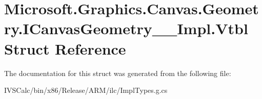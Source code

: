 \hypertarget{struct_microsoft_1_1_graphics_1_1_canvas_1_1_geometry_1_1_i_canvas_geometry_____impl_1_1_vtbl}{}\section{Microsoft.\+Graphics.\+Canvas.\+Geometry.\+I\+Canvas\+Geometry\+\_\+\+\_\+\+Impl.\+Vtbl Struct Reference}
\label{struct_microsoft_1_1_graphics_1_1_canvas_1_1_geometry_1_1_i_canvas_geometry_____impl_1_1_vtbl}


The documentation for this struct was generated from the following file\+:\begin{DoxyCompactItemize}
\item 
I\+V\+S\+Calc/bin/x86/\+Release/\+A\+R\+M/ilc/Impl\+Types.\+g.\+cs\end{DoxyCompactItemize}
